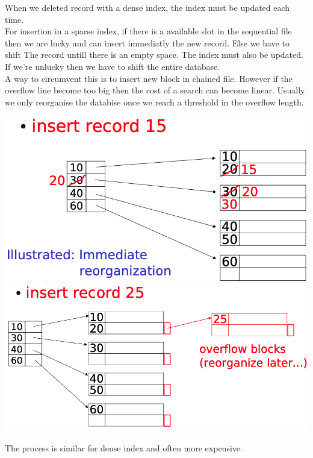 \documentclass[12pt,a4paper]{article}
\begin{document}
When we deleted record with a dense index, the index must be updated each time.\\

For insertion in a sparse index, if there is a available slot in the sequential file then we are lucky and can insert immediatly the new record. Else we have to shift The record untill there is an empty space. The index must also be updated. If we're unlucky then we have to shift the entire database. \\
A way to circumvent this is to insert new block in chained file. However if the overflow line become too big then the cost of a search can become linear. Usually we only reorganise the databise once we reach a threshold in the overflow length.
\begin{center}
\includegraphics[scale=0.25]{img/img31.png}
\includegraphics[scale=0.25]{img/img32.png}
\end{center}
The process is similar for dense index and often more expensive.
\end{document}
